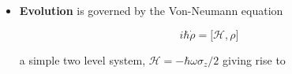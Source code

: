 \begin{itemize}
  \begin{equation}\label{expectation}
    \begin{aligned}
      \iaverage{\sigma_z}           &=          \itrace{\begin{pmatrix}
          \rho_{00}&\rho_{01}\\\rho_{10}&\rho_{11}
        \end{pmatrix}\begin{pmatrix}
          1&0\\0&-1
        \end{pmatrix}}             =            \itrace{\begin{pmatrix}
          \rho_{00}&-\rho_{01}\\\rho_{10}&-\rho_{11}
        \end{pmatrix}} = \rho_{00}-\rho_{11}; \\
      &\red{\rho_{11} = \frac{
          1-\iaverage{\sigma_z}}{2}};\quad \quad \red{d\rho_{00} = \frac{1+\iaverage{\sigma_z}}{2}}\\
      \iaverage{\sigma_x} &=  \rho_{01}+\rho_{10}\\
      \iaverage{\sigma_y} &=  i\rho_{01}-i\rho_{10}\\
      \iaverage{\sigma_{+}} &= \frac{\iaverage{\sigma_x}+i\iaverage{\sigma_y}}{2} = \rho_{10}\\
      \iaverage{\sigma_{-}}& = \frac{\iaverage{\sigma_x}-i\iaverage{\sigma_y}}{2} = \rho_{01}\\
    \end{aligned}
  \end{equation}

\item \textbf{Evolution} is governed by the Von-Neumann equation

  \begin{equation}\label{vonN}
    i\hbar\dot{\rho} = \bigg[\mathcal{H},\rho\bigg]
  \end{equation}

  \noindent        a       simple        two       level        system,
  $ \mathcal{H} = -\hbar\omega\sigma_z/2 $ giving rise to


\end{itemize}
